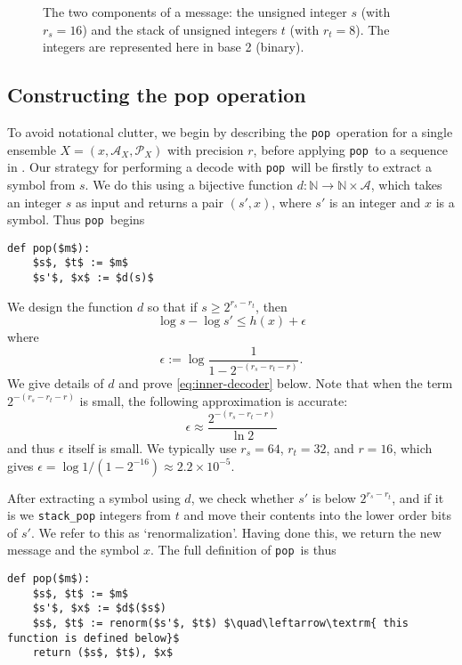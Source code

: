\documentclass{article}
\theoremstyle{definition}
\newcommand{\pop}{\texttt{pop}}
\begin{document}
  \begin{figure}[ht]
    \centering
    \drawmessage
    \caption{
      The two components of a message: the unsigned integer \(s\) (with \(r_s =
      16\)) and the stack of unsigned integers \(t\) (with \(r_t = 8\)). The
      integers are represented here in base 2 (binary).
  }
    \label{fig:message}
  \end{figure}


\subsection{Constructing the pop operation}
  To avoid notational clutter, we begin by describing the \pop\ operation for a
  single ensemble \(X = (x, \mathcal{A}_X, \mathcal{P}_X)\) with precision
  \(r\), before applying \pop\ to a sequence in . Our
  strategy for performing a decode with \pop\ will be firstly to extract a
  symbol from \(s\). We do this using a bijective function \(d:\mathbb
  N\rightarrow\mathbb N\times\mathcal{A}\), which takes an integer \(s\) as
  input and returns a pair \((s', x)\), where \(s'\) is an integer and \(x\) is
  a symbol. Thus \pop\ begins
  \begin{lstlisting}
def pop($m$):
    $s$, $t$ := $m$
    $s'$, $x$ := $d(s)$
  \end{lstlisting}
  We design the function \(d\) so that if \(s\geq 2^{r_s - r_t}\), then
  \begin{equation}\label{eq:inner-decoder}
    \log s - \log s' \leq h(x) + \epsilon
  \end{equation}
  where
  \begin{equation}
    \epsilon := \log \frac{1}{1 - 2^{-(r_s - r_t - r)}}.
  \end{equation}
  We give details of \(d\) and prove \cref{eq:inner-decoder} below. Note that
  when the term \(2^{-(r_s - r_t - r)}\) is small, the following approximation
  is accurate:
  \begin{equation}
    \epsilon \approx \frac{2^{-(r_s - r_t - r)}}{\ln 2}
  \end{equation}
  and thus $\epsilon$ itself is small. We typically use \(r_s = 64\), \(r_t =
  32\), and \(r = 16\), which gives \(\epsilon = \log 1/(1 - 2^{-16}) \approx
  2.2 \times 10^{-5}\).

  After extracting a symbol using \(d\), we check whether \(s'\) is below
  \(2^{r_s - r_t}\), and if it is we \texttt{stack\_pop} integers from \(t\)
  and move their contents into the lower order bits of \(s'\). We refer to this
  as `renormalization'.  Having done this, we return the new message and the
  symbol \(x\). The full definition of \pop\ is thus
  \begin{lstlisting}[frame=single]
def pop($m$):
    $s$, $t$ := $m$
    $s'$, $x$ := $d$($s$)
    $s$, $t$ := renorm($s'$, $t$) $\quad\leftarrow\textrm{ this function is defined below}$
    return ($s$, $t$), $x$
  \end{lstlisting}
\end{document}

